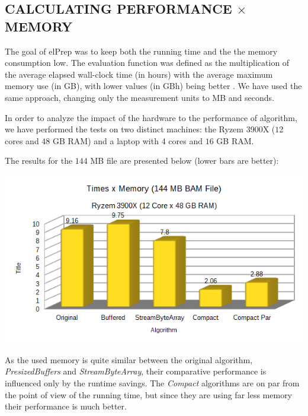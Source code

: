 \documentclass[a4paper,twoside]{article}
\begin{document}




 
 
\subsection{\uppercase{Calculating performance $\times$ memory}}
The goal of elPrep was to keep both the running time and the the memory consumption low. The evaluation function was defined as the multiplication of the average elapsed wall-clock time (in hours) with the average maximum memory use (in GB), with lower values (in GBh) being better \cite{costanza:2019}.
We have used the same approach, changing only the measurement units to MB and seconds.

In order to analyze the impact of the hardware to the performance of algorithm, we have performed the tests on two distinct machines: the Ryzem 3900X ($1$2 cores and $48$ GB RAM) and a laptop with $4$ cores and $16$ GB RAM.

The results for the $144$ MB file are presented below (lower bars are better):
\begin{center}
	\includegraphics[scale=0.5]{images/times_and_memory_chart_small_144mb_ryzen.png}
\end{center}

As the used memory is quite similar between the original algorithm, {\it PresizedBuffers} and {\it StreamByteArray}, their comparative performance is influenced only by the runtime savings. 
The {\it Compact} algorithms are on par from the point of view of the running time, but since they are using far less memory their performance is much better.
\end{document}
